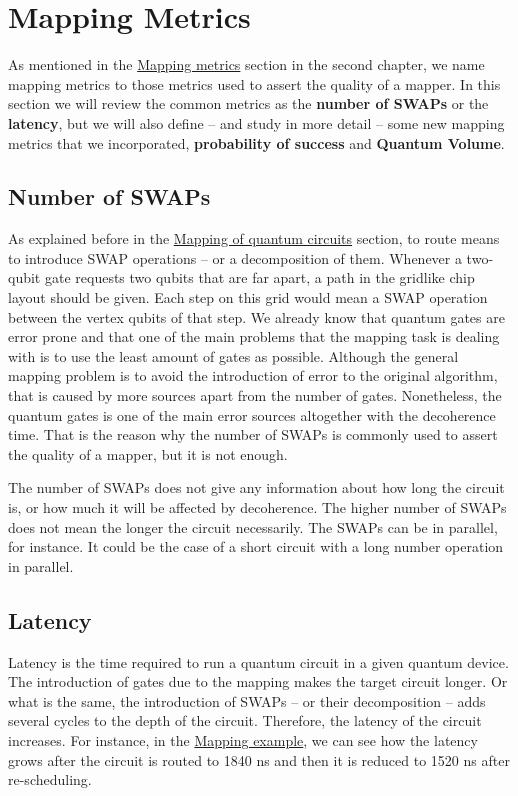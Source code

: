 \section*{Mapping Metrics}
\label{sec:org577a93f}
As mentioned in the \href{chapter-2.org}{Mapping metrics} section in the second chapter, we name mapping metrics to those metrics used to assert the quality of a mapper.
In this section we will review the common metrics as the \textbf{number of SWAPs} or the \textbf{latency}, but we will also define -- and study in more detail -- some new mapping metrics that we incorporated, \textbf{probability of success} and \textbf{Quantum Volume}.

\subsection*{Number of SWAPs}
\label{sec:orgfd92974}

As explained before in the \href{chapter-2.org}{Mapping of quantum circuits} section, to route means to introduce SWAP operations -- or a decomposition of them.
Whenever a two-qubit gate requests two qubits that are far apart, a path in the gridlike chip layout should be given.
Each step on this grid would mean a SWAP operation between the vertex qubits of that step.
We already know that quantum gates are error prone and that one of the main problems that the mapping task is dealing with is to use the least amount of gates as possible.
Although the general mapping problem is to avoid the introduction of error to the original algorithm, that is caused by more sources apart from the number of gates.
Nonetheless, the quantum gates is one of the main error sources altogether with the decoherence time.
That is the reason why the number of SWAPs is commonly used to assert the quality of a mapper, but it is not enough.

The number of SWAPs does not give any information about how long the circuit is, or how much it will be affected by decoherence.
The higher number of SWAPs does not mean the longer the circuit necessarily.
The SWAPs can be in parallel, for instance.
It could be the case of a short circuit with a long number operation in parallel.

\subsection*{Latency}
\label{sec:org55a0414}

Latency is the time required to run a quantum circuit in a given quantum device.
The introduction of gates due to the mapping makes the target circuit longer.
Or what is the same, the introduction of SWAPs -- or their decomposition -- adds several cycles to the depth of the circuit.
Therefore, the latency of the circuit increases.
For instance, in the \href{mapping_of_quantum_circuits.org}{Mapping example}, we can see how the latency grows after the circuit is routed to 1840 ns and then it is reduced to 1520 ns after re-scheduling.


